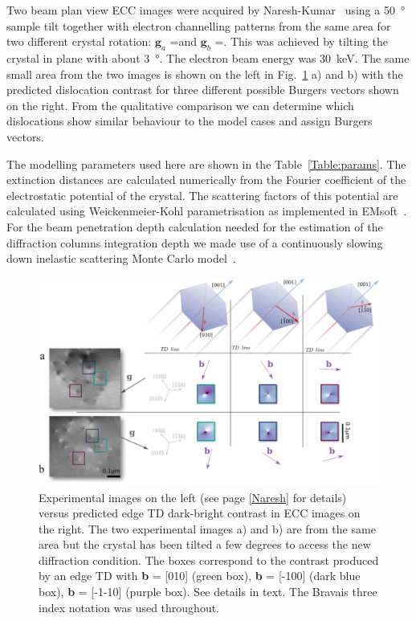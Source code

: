\label{Naresh}
Two beam plan view ECC images were acquired by Naresh-Kumar~\cite{Naresh} using a \SI{50}{\degree}  sample tilt together with electron channelling patterns from the same area for two different crystal rotation: $\mathbf{g}_a$ =\hkl[-5-7-3] and $\mathbf{g}_b$ =\hkl[75-3]. This was achieved by tilting the crystal in plane with about \SI{3}{\degree}. The electron beam energy was \SI{30}{\kilo \electronvolt}. The same small area from the two images is shown on the left in Fig.~\ref{fig:contrast} a) and b) with the predicted dislocation contrast for three different possible Burgers vectors shown on the right. From the qualitative comparison we can determine which dislocations show similar behaviour to the model cases and assign Burgers vectors.

The modelling parameters used here are shown in the Table~\ref{Table:params}. The extinction distances are calculated numerically from the Fourier coefficient of the electrostatic potential of the crystal. The scattering factors of this potential are calculated using Weickenmeier-Kohl parametrisation as implemented in EMsoft~\cite{EMsoft}. For the beam penetration depth calculation needed for the estimation of the diffraction columns integration depth we made use of a continuously slowing down inelastic scattering Monte Carlo model~\cite{casino}. 






\begin{figure}
    \centering
    \includegraphics[width=1\linewidth]{Figures/contrast.png}
    \caption[Predicted contrast comparison with experiments.]{ Experimental images on the left (see page \ref{Naresh} for details) versus predicted edge TD dark-bright contrast in ECC images on the right. The two experimental images a) and b) are from the same area but the crystal has been tilted a few degrees to access the new diffraction condition. The boxes correspond to the contrast produced by an edge TD with \textbf{b} = [010] (green box),\textbf{ b} = [-100] (dark blue box), \textbf{b} = [-1-10] (purple box). See details in text. The Bravais three index notation was used throughout.}
    \label{fig:contrast}
\end{figure}

